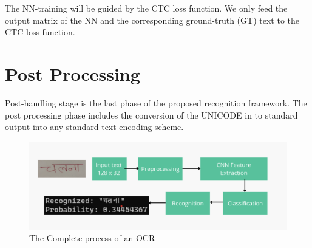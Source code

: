 The NN-training will be guided by the CTC loss function. We only feed the output matrix of the NN and the corresponding ground-truth (GT) text to the CTC loss function.

\section{Post Processing}
Post-handling stage is the last phase of the proposed recognition framework. The post processing phase includes the conversion of the UNICODE in to standard output into any standard text encoding scheme.

\begin{figure}[H]
    \centering
    \includegraphics[width=150mm]{figures/image4.png}
    \caption{The Complete process of an OCR}
\end{figure}